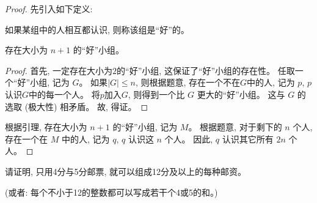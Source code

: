 \documentclass[a4paper, justified]{tufte-handout}
\begin{document}
\begin{proof}
  先引入如下定义:
  \begin{definition*}
    如果某组中的人相互都认识, 则称该组是``好''的。
  \end{definition*}
  \begin{lemma*}
    存在大小为 $n + 1$ 的``好''小组。
  \end{lemma*}
  \begin{proof}
    首先, 一定存在大小为$2$的``好''小组, 这保证了``好''小组的存在性。
    任取一个``好''小组, 记为 $G$。
    如果$|G| \le n$, 则根据题意, 存在一个不在$G$中的人, 记为 $p$,
    $p$ 认识$G$中的每一个人。
    将$p$加入$G$, 则得到一个比 $G$ 更大的``好''小组。
    这与 $G$ 的选取 (极大性) 相矛盾。
    故, 得证。
  \end{proof}

  \vspace{1em}
  根据引理, 存在大小为 $n+1$ 的``好''小组, 记为 $M$。
  根据题意, 对于剩下的 $n$ 个人, 存在一个在 $M$ 中的人, 记为 $q$, $q$ 认识这 $n$ 个人。
  因此, $q$ 认识其它所有 $2n$ 个人。
\end{proof}

\begin{problem}
  请证明, 只用4分与5分邮票, 就可以组成12分及以上的每种邮资。

  \noindent (或者: 每个不小于12的整数都可以写成若干个4或5的和。)
\end{problem}
\end{document}
